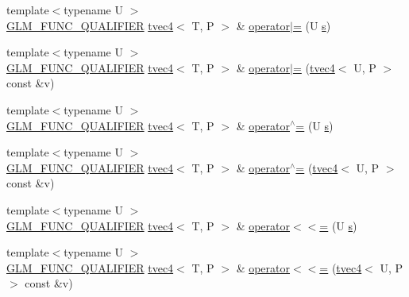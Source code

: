 \begin{DoxyCompactItemize}
\item 
{\footnotesize template$<$typename U $>$ }\\\hyperlink{setup_8hpp_a33fdea6f91c5f834105f7415e2a64407}{G\+L\+M\+\_\+\+F\+U\+N\+C\+\_\+\+Q\+U\+A\+L\+I\+F\+I\+ER} \hyperlink{structglm_1_1detail_1_1tvec4}{tvec4}$<$ T, P $>$ \& \hyperlink{structglm_1_1detail_1_1tvec4_a0a81f104c676c2317375b44b39f335bc}{operator$\vert$=} (U \hyperlink{structglm_1_1detail_1_1tvec4_a82cbced4cbd070056c5acbc1d4d4906f}{s})
\item 
{\footnotesize template$<$typename U $>$ }\\\hyperlink{setup_8hpp_a33fdea6f91c5f834105f7415e2a64407}{G\+L\+M\+\_\+\+F\+U\+N\+C\+\_\+\+Q\+U\+A\+L\+I\+F\+I\+ER} \hyperlink{structglm_1_1detail_1_1tvec4}{tvec4}$<$ T, P $>$ \& \hyperlink{structglm_1_1detail_1_1tvec4_a73389ea20bb805a54b9699bca730f142}{operator$\vert$=} (\hyperlink{structglm_1_1detail_1_1tvec4}{tvec4}$<$ U, P $>$ const \&v)
\item 
{\footnotesize template$<$typename U $>$ }\\\hyperlink{setup_8hpp_a33fdea6f91c5f834105f7415e2a64407}{G\+L\+M\+\_\+\+F\+U\+N\+C\+\_\+\+Q\+U\+A\+L\+I\+F\+I\+ER} \hyperlink{structglm_1_1detail_1_1tvec4}{tvec4}$<$ T, P $>$ \& \hyperlink{structglm_1_1detail_1_1tvec4_a3c211495ff2065e67eec3738f67395ff}{operator$^\wedge$=} (U \hyperlink{structglm_1_1detail_1_1tvec4_a82cbced4cbd070056c5acbc1d4d4906f}{s})
\item 
{\footnotesize template$<$typename U $>$ }\\\hyperlink{setup_8hpp_a33fdea6f91c5f834105f7415e2a64407}{G\+L\+M\+\_\+\+F\+U\+N\+C\+\_\+\+Q\+U\+A\+L\+I\+F\+I\+ER} \hyperlink{structglm_1_1detail_1_1tvec4}{tvec4}$<$ T, P $>$ \& \hyperlink{structglm_1_1detail_1_1tvec4_af96b8c8c3da7f1d716d6b95c77170172}{operator$^\wedge$=} (\hyperlink{structglm_1_1detail_1_1tvec4}{tvec4}$<$ U, P $>$ const \&v)
\item 
{\footnotesize template$<$typename U $>$ }\\\hyperlink{setup_8hpp_a33fdea6f91c5f834105f7415e2a64407}{G\+L\+M\+\_\+\+F\+U\+N\+C\+\_\+\+Q\+U\+A\+L\+I\+F\+I\+ER} \hyperlink{structglm_1_1detail_1_1tvec4}{tvec4}$<$ T, P $>$ \& \hyperlink{structglm_1_1detail_1_1tvec4_a08906968ad1d2a2e5b467e140f7a5550}{operator$<$$<$=} (U \hyperlink{structglm_1_1detail_1_1tvec4_a82cbced4cbd070056c5acbc1d4d4906f}{s})
\item 
{\footnotesize template$<$typename U $>$ }\\\hyperlink{setup_8hpp_a33fdea6f91c5f834105f7415e2a64407}{G\+L\+M\+\_\+\+F\+U\+N\+C\+\_\+\+Q\+U\+A\+L\+I\+F\+I\+ER} \hyperlink{structglm_1_1detail_1_1tvec4}{tvec4}$<$ T, P $>$ \& \hyperlink{structglm_1_1detail_1_1tvec4_a22bfc21e16155253755657844ca76d36}{operator$<$$<$=} (\hyperlink{structglm_1_1detail_1_1tvec4}{tvec4}$<$ U, P $>$ const \&v)

\end{DoxyCompactItemize}
